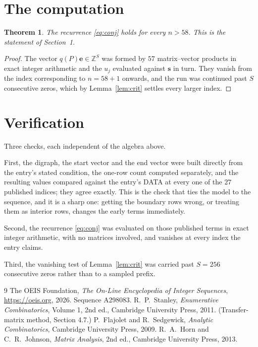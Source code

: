 \documentclass[11pt,a4paper]{article}
\theoremstyle{plain}
\newtheorem{theorem}{Theorem}
\theoremstyle{definition}
\begin{document}
\section{The computation}

\begin{theorem}
The recurrence \eqref{eq:conj} holds for every $n>58$. This is the statement of
Section~1.
\end{theorem}

\begin{proof}
The vector $q(P)\mathbf{e}\in\mathbb{Z}^{S}$ was formed by $57$ matrix--vector
products in exact integer arithmetic and the $u_j$ evaluated against $\mathbf{s}$ in turn.
They vanish from the index corresponding to $n=58+1$ onwards, and the run was continued
past $S$ consecutive zeros, which by Lemma~\ref{lem:crit} settles every larger index.
\end{proof}

\section{Verification}

Three checks, each independent of the algebra above.

First, the digraph, the start vector and the end vector were built directly from the
entry's stated condition, the one-row count computed separately, and the resulting values
compared against the entry's DATA at every one of the $27$ published indices; they
agree exactly. This is the check that ties the model to the sequence, and it is a sharp one:
getting the boundary rows wrong, or treating them as interior rows, changes the early terms
immediately.

Second, the recurrence \eqref{eq:conj} was evaluated on those published terms in exact
integer arithmetic, with no matrices involved, and vanishes at every index the entry claims.

Third, the vanishing test of Lemma~\ref{lem:crit} was carried past $S=256$ consecutive
zeros rather than to a sampled prefix.

\begin{thebibliography}{9}
 The OEIS Foundation, \emph{The On-Line Encyclopedia of Integer
Sequences}, \url{https://oeis.org}, 2026. Sequence A298083.
 R.~P.~Stanley, \emph{Enumerative Combinatorics}, Volume 1, 2nd ed.,
Cambridge University Press, 2011. (Transfer-matrix method, Section 4.7.)
 P.~Flajolet and R.~Sedgewick, \emph{Analytic Combinatorics}, Cambridge
University Press, 2009.
 R.~A.~Horn and C.~R.~Johnson, \emph{Matrix Analysis}, 2nd ed., Cambridge
University Press, 2013.
\end{thebibliography}
\end{document}
